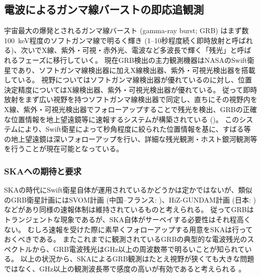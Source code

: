 \subsection{電波によるガンマ線バーストの即応追観測} \label{transients.s3.grb}
宇宙最大の爆発とされるガンマ線バースト (gamma-ray burst; GRB) はまず数100~keV程度のソフトガンマ線で明るく輝き (1--10秒程度続く即時放射と呼ばれる)、次いでX線、紫外・可視・赤外光、電波など多波長で輝く「残光」と呼ばれるフェーズに移行していく。
現在GRB検出の主力観測機器はNASAのSwift衛星であり、ソフトガンマ線検出器に加えX線検出器、紫外・可視光検出器を搭載している。
視野についてはソフトガンマ線検出器が優れているのに対し、位置決定精度についてはX線検出器、紫外・可視光検出器が優れている。
従って即時放射をまず広い視野を持つソフトガンマ線検出器で同定し、直ちにその視野内をX線、紫外・可視光検出器でフォローアップすることで残光を検出、GRBの正確な位置情報を地上望遠鏡等に速報するシステムが構築されている ()。
このシステムにより、Swift衛星によって秒角程度に絞られた位置情報を基に、すばる等の地上望遠鏡は深いフォローアップを行い、詳細な残光観測・ホスト銀河観測等を行うことが現在可能となっている。

\subsubsection{SKAへの期待と要求}
SKAの時代にSwift衛星自体が運用されているかどうかは定かではないが、類似のGRB衛星計画にはSVOM計画 (中国--フランス: \citealt{2011CRPhy..12..298P})、HiZ-GUNDAM計画 (日本: \citealt{2014SPIE.9144E..2SY}) などがあり同様の速報体制は維持されているものと考えられる。
従ってGRBはトランジェントな現象であるが、SKA自体がサーベイする必要性はそれ程高くない。
むしろ速報を受けた際に素早くフォローアップする用意をSKAは行っておくべきである。
またこれまでに観測されているGRBの典型的な電波残光のスペクトルから、GRB電波残光はGHz以上の周波数帯で明るいことが知られている。
以上の状況から、SKAによるGRB観測はたとえ視野が狭くても大きな問題ではなく、GHz以上の観測波長帯で感度の高い\skamid{}が有効であると考えられる \citep{2015arXiv150104629B}。

